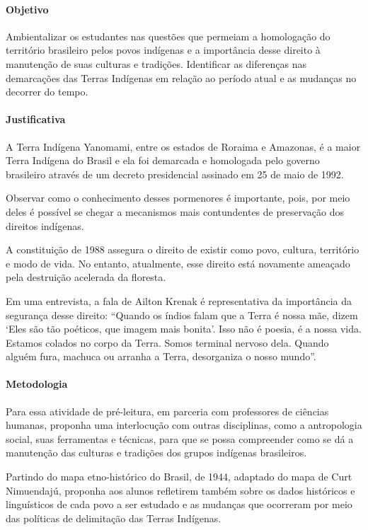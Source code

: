 \documentclass[12pt]{extarticle}
\begin{document}
\paragraph{Objetivo} Ambientalizar os estudantes nas questões que permeiam a homologação
do território brasileiro pelos povos indígenas e a importância desse direito à manutenção
de suas culturas e tradições.
Identificar as diferenças nas demarcações das Terras Indígenas em relação ao período
atual e as mudanças no decorrer do tempo.

\paragraph{Justificativa} A Terra Indígena Yanomami, entre os estados de Roraima e Amazonas, 
é a maior Terra Indígena do Brasil e ela foi demarcada e homologada pelo governo brasileiro 
através de um decreto presidencial assinado em 25 de maio de 1992.

Observar como o conhecimento desses pormenores é importante, pois, por meio deles é
possível se chegar a mecanismos mais contundentes de preservação dos direitos indígenas. 

A constituição de 1988 assegura o direito de existir como povo, cultura, território e modo de vida.
No entanto, atualmente, esse direito está novamente ameaçado pela destruição acelerada da floresta.

Em uma entrevista, a fala de Ailton Krenak é representativa da importância da segurança desse direito:
``Quando os índios falam que a Terra é nossa mãe, dizem ‘Eles são tão poéticos, que imagem mais bonita’. 
Isso não é poesia, é a nossa vida. 
Estamos colados no corpo da Terra. 
Somos terminal nervoso dela. 
Quando alguém fura, machuca ou arranha a Terra, desorganiza o nosso mundo''. 

\paragraph{Metodologia}

Para essa atividade de pré-leitura, em parceria com professores de ciências humanas, 
proponha uma interlocução com outras disciplinas, como a antropologia social, suas ferramentas 
e técnicas, para que se possa compreender como se dá a manutenção das culturas e tradições dos 
grupos indígenas brasileiros. 

Partindo do mapa etno-histórico do Brasil, de 1944, adaptado do mapa de Curt Nimuendajú,
proponha aos alunos refletirem também sobre os dados históricos e linguísticos de cada povo
a ser estudado e as mudanças que ocorreram por meio das políticas de delimitação das Terras 
Indígenas. 
\end{document}
